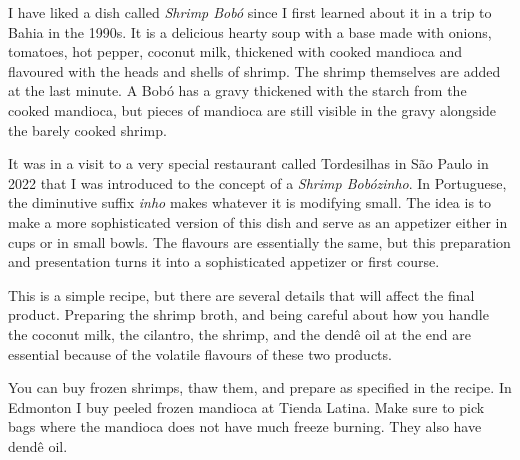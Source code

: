 \documentclass[11pt,letterpaper]{article}
\begin{document}



I have liked a dish called {\it Shrimp Bob\'o} since I first learned about it in a trip to Bahia in the 1990s. It is a delicious hearty soup with a base made with onions, tomatoes, hot pepper, coconut milk, thickened with cooked mandioca and flavoured with the heads and shells of shrimp. The shrimp themselves are added at the last minute. A Bob\'o has a gravy thickened with the starch from the cooked mandioca, but pieces of mandioca are still visible in the gravy alongside the barely cooked shrimp.

It was in a visit to a very special restaurant called Tordesilhas in S\~ao Paulo in 2022 that I was introduced to the concept of a {\it Shrimp Bob\'ozinho}. In Portuguese, the diminutive suffix {\it inho} makes whatever it is modifying small. The idea is to make a more sophisticated version of this dish and serve as an appetizer either in cups or in small bowls. The flavours are essentially the same, but this preparation and presentation turns it into a sophisticated appetizer or first course.

This is a simple recipe, but there are several details that will affect the final product. Preparing the shrimp broth, and being careful about how you handle the coconut milk, the cilantro, the shrimp, and the dend\^e oil at the end are essential because of the volatile flavours of these two products.

You can buy frozen shrimps, thaw them, and prepare as specified in the recipe. In Edmonton I buy peeled frozen mandioca at Tienda Latina. Make sure to pick bags where the mandioca does not have much freeze burning. They also have dend\^e oil.
 
 
\vspace{0.3in}
\end{document}
